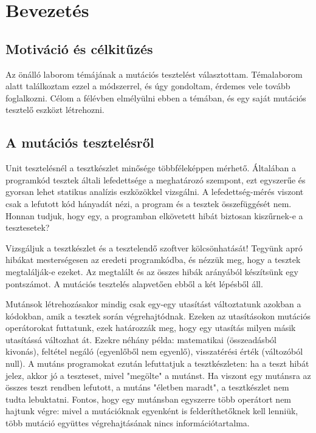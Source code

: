 
\section{Bevezetés}
\subsection{Motiváció és célkitűzés}
Az önálló laborom témájának a mutációs tesztelést választottam. Témalaborom alatt találkoztam ezzel a módszerrel, és úgy gondoltam, érdemes vele tovább foglalkozni. Célom a félévben elmélyülni ebben a témában, és egy saját mutációs tesztelő eszközt létrehozni. 
\subsection{A mutációs tesztelésről}
Unit tesztelésnél a tesztkészlet minősége többféleképpen mérhető. Általában a programkód tesztek általi lefedettsége a meghatározó szempont, ezt egyszerűe és gyorsan lehet statikus analízis eszközökkel vizsgálni. A lefedettség-mérés viszont csak a lefutott kód hányadát nézi, a program és a tesztek összefüggését nem. Honnan tudjuk, hogy egy, a programban elkövetett hibát biztosan kiszűrnek-e a tesztesetek?

Vizsgáljuk a tesztkészlet és a tesztelendő szoftver kölcsönhatását! Tegyünk apró hibákat mesterségesen az eredeti programkódba, és nézzük meg, hogy a tesztek megtalálják-e ezeket. Az megtalált és az összes hibák arányából készítsünk egy pontszámot. A mutációs tesztelés alapvetően ebből a két lépésből áll.

Mutánsok létrehozásakor mindig csak egy-egy utasítást változtatunk azokban a kódokban, amik a tesztek során végrehajtódnak. Ezeken az utasításokon mutációs operátorokat futtatunk, ezek határozzák meg, hogy egy utasítás milyen másik utasítássá változhat át. Ezekre néhány példa: matematikai (összeadásból kivonás), feltétel negáló (egyenlőből nem egyenlő), visszatérési érték (változóból null). A mutáns programokat ezután lefuttatjuk a tesztkészleten: ha a teszt hibát jelez, akkor jó a teszteset, mivel "megölte" a mutánst. Ha viszont egy mutánsra az összes teszt rendben lefutott, a mutáns "életben maradt", a tesztkészlet nem tudta lebuktatni. Fontos, hogy egy mutánsban egyszerre több operátort nem hajtunk végre: mivel a mutációknak egyenként is felderíthetőknek kell lenniük, több mutáció együttes végrehajtásának nincs információtartalma. 

